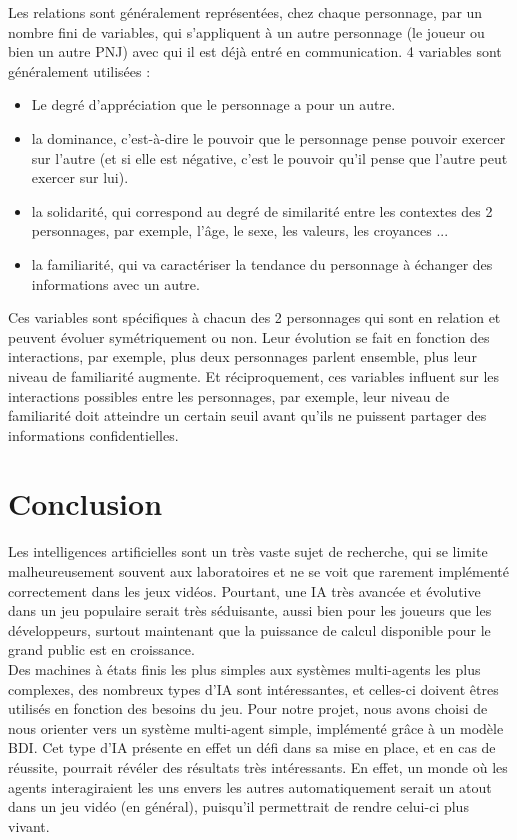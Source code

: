 \documentclass[asi]{picINSAIA}
\begin{document}
Les relations sont généralement représentées, chez chaque personnage, par un nombre fini de variables, qui s’appliquent à un autre personnage (le joueur ou bien un autre PNJ) avec qui il est déjà entré en communication. 4 variables sont généralement utilisées :
\begin{itemize}
\item Le degré d'appréciation que le personnage a pour un autre.
\item la dominance, c'est-à-dire le pouvoir que le personnage pense pouvoir exercer sur l'autre (et si elle est négative, c'est le pouvoir qu'il pense que l'autre peut exercer sur lui).
\item la solidarité, qui correspond au degré de similarité entre les contextes des 2 personnages, par exemple, l'âge, le sexe, les valeurs, les croyances ...
\item la familiarité, qui va caractériser la tendance du personnage à échanger des informations avec un autre.
\end{itemize}
Ces variables sont spécifiques à chacun des 2 personnages qui sont en relation et peuvent évoluer symétriquement ou non. Leur évolution se fait en fonction des interactions, par exemple, plus deux personnages parlent ensemble, plus leur niveau de familiarité augmente. Et réciproquement, ces variables influent sur les interactions possibles entre les personnages, par exemple, leur niveau de familiarité doit atteindre un certain seuil avant qu'ils ne puissent partager des informations confidentielles. 


\chapter{Conclusion}
Les intelligences artificielles sont un très vaste sujet de recherche, qui se limite malheureusement souvent aux laboratoires et ne se voit que rarement implémenté correctement dans les jeux vidéos. Pourtant, une IA très avancée et évolutive dans un jeu populaire serait très séduisante, aussi bien pour les joueurs que les développeurs, surtout maintenant que la puissance de calcul disponible pour le grand public est en croissance.\\

Des machines à états finis les plus simples aux systèmes multi-agents les plus complexes, des nombreux types d'IA sont intéressantes, et celles-ci doivent êtres utilisés en fonction des besoins du jeu.
Pour notre projet, nous avons choisi de nous orienter vers un système multi-agent simple, implémenté grâce à un modèle BDI.
Cet type d'IA présente en effet un défi dans sa mise en place, et en cas de réussite, pourrait révéler des résultats très intéressants.
En effet, un monde où les agents interagiraient les uns envers les autres automatiquement serait un atout dans un jeu vidéo (en général), puisqu'il permettrait de rendre celui-ci plus vivant.
\end{document}
